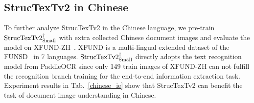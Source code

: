 \documentclass{article} %
\begin{document}
\begin{table}[ht]
\caption{Experimental results and performance comparison of the form understanding task on FUNSD. The entity-level F1-Score is used to measure model accuracy.}
\label{form_understanding}
\vspace{-0.5em}
\begin{center}
\end{center}
\vspace{-0.5em}
\end{table}

\subsection{StrucTexTv2 in Chinese}
To further analyze StrucTexTv2 in the Chinese language, we pre-train $\rm StrucTexTv2^{\dag}_{Small}$ with extra collected Chinese document images and evaluate the model on XFUND-ZH~\cite{XuL0WLFZW22}. XFUND is a multi-lingual extended dataset of the FUNSD~\cite{jaume2019funsd} in 7 languages. $\rm StrucTexTv2^{\dag}_{Small}$ directly adopts the text recognition model from PaddleOCR since only 149 train images of XFUND-ZH can not fulfill the recognition branch training for the end-to-end information extraction task. Experiment results in Tab.~\ref{chinese_ie} show that StrucTexTv2 can benefit the task of document image understanding in Chinese.
\end{document}
